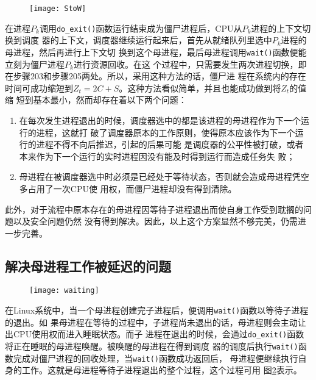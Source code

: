 \documentclass{swfuthesism}
\begin{document}
\begin{figure}
  \centering
  \texttt{[image: StoW]}
  \label{fig:StoW}
\end{figure}

在进程$P_k$调用\texttt{do\_exit()}函数运行结束成为僵尸进程后，CPU从$P_k$进程的上下文切换到调度
器的上下文，调度器继续运行起来后，首先从就绪队列里选中$P_k$进程的母进程，然后再进行上下文切
换到这个母进程，最后母进程调用\texttt{wait()}函数便能立刻为僵尸进程$P_k$进行资源回收。在这
个过程中，只需要发生两次进程切换，即在步骤203和步骤205两处。所以，采用这种方法的话，僵尸进
程在系统内的存在时间可成功缩短到$Z_t=2C+S$。这种方法看似简单，并且也能成功做到将$Z_t$的值缩
短到基本最小，然而却存在着以下两个问题：

\begin{enumerate}
\item 在每次发生进程退出的时候，调度器选中的都是该进程的母进程作为下一个运行的进程，这就打
  破了调度器原本的工作原则，使得原本应该作为下一个运行的进程不得不向后推迟，引起的后果可能
  是调度器的公平性被打破，或者本来作为下一个运行的实时进程因没有能及时得到运行而造成任务失
  败；
\item 母进程在被调度器选中时必须是已经处于等待状态，否则就会造成母进程凭空多占用了一次CPU使
  用权，而僵尸进程却没有得到清除。
\end{enumerate}

此外，对于流程中原本存在的母进程因等待子进程退出而使自身工作受到耽搁的问题以及安全问题仍然
没有得到解决。因此，以上这个方案显然不够完美，仍需进一步完善。

\subsection{解决母进程工作被延迟的问题}

\begin{figure}
  \centering
  \texttt{[image: waiting]}
  \label{fig:wait}
\end{figure}

在Linux系统中，当一个母进程创建完子进程后，便调用\texttt{wait()}函数以等待子进程的退出。如
果母进程在等待的过程中，子进程尚未退出的话，母进程则会主动让出CPU使用权而进入睡眠状态。而子
进程在退出的时候，会通过\texttt{do\_exit()}函数将正在睡眠的母进程唤醒。被唤醒的母进程在得到调度
器的调度后执行\texttt{wait()}函数完成对僵尸进程的回收处理，当\texttt{wait()}函数成功返回后，
母进程便继续执行自身的工作。这就是母进程等待子进程退出的整个过程，这个过程可用
图\ref{fig:wait}表示。
\end{document}
